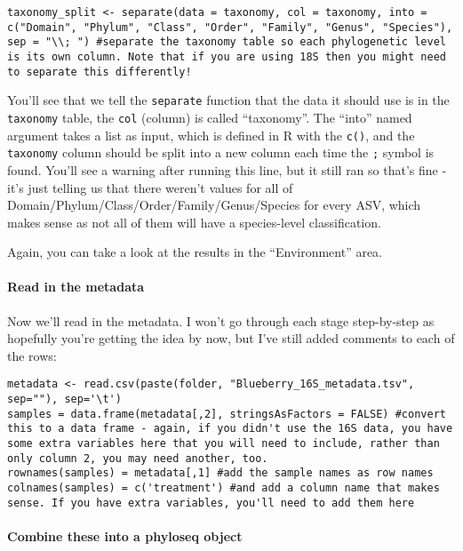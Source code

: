 \documentclass[
]{book}
\begin{document}
\begin{verbatim}
taxonomy_split <- separate(data = taxonomy, col = taxonomy, into = c("Domain", "Phylum", "Class", "Order", "Family", "Genus", "Species"), sep = "\\; ") #separate the taxonomy table so each phylogenetic level is its own column. Note that if you are using 18S then you might need to separate this differently!
\end{verbatim}

You'll see that we tell the \texttt{separate} function that the data it should use is in the \texttt{taxonomy} table, the \texttt{col} (column) is called ``taxonomy''. The ``into'' named argument takes a list as input, which is defined in R with the \texttt{c()}, and the \texttt{taxonomy} column should be split into a new column each time the \texttt{;} symbol is found. You'll see a warning after running this line, but it still ran so that's fine - it's just telling us that there weren't values for all of Domain/Phylum/Class/Order/Family/Genus/Species for every ASV, which makes sense as not all of them will have a species-level classification.

Again, you can take a look at the results in the ``Environment'' area.

\paragraph{Read in the metadata}\label{read-in-the-metadata}

Now we'll read in the metadata. I won't go through each stage step-by-step as hopefully you're getting the idea by now, but I've still added comments to each of the rows:

\begin{verbatim}
metadata <- read.csv(paste(folder, "Blueberry_16S_metadata.tsv", sep=""), sep='\t')
samples = data.frame(metadata[,2], stringsAsFactors = FALSE) #convert this to a data frame - again, if you didn't use the 16S data, you have some extra variables here that you will need to include, rather than only column 2, you may need another, too. 
rownames(samples) = metadata[,1] #add the sample names as row names
colnames(samples) = c('treatment') #and add a column name that makes sense. If you have extra variables, you'll need to add them here
\end{verbatim}

\paragraph{Combine these into a phyloseq object}\label{combine-these-into-a-phyloseq-object}
\end{document}

